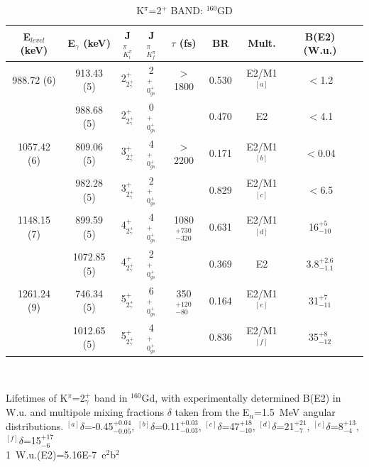 \begin{table}[h!]
\begin{center}
\caption{K$^\pi$=2$^+$ BAND: $^{160}$GD \label{tab:160Gd_gamma}}

\begin{tabular}{ccccccccc}
E$_{level}$ (keV) & E$_\gamma$ (keV) & J$^\pi_{K^\pi_i}$ & J$^\pi_{K^\pi_f}$ & $\tau$ (fs) & BR & Mult. &  B(E2) (W.u.) \\
\hline
\hline
988.72 (6)  & 913.43 (5) & 2$^+_{2^+_\gamma}$ & 2$^+_{0^+_{gs}}$ & $>$1800 & 0.530 & E2/M1$^{[a]}$ & $<$1.2\\%
            & 988.68 (5) & 2$^+_{2^+_\gamma}$ & 0$^+_{0^+_{gs}}$ &         & 0.470 & E2         & $<$4.1\\%

1057.42 (6) & 809.06 (5) & 3$^+_{2^+_\gamma}$ & 4$^+_{0^+_{gs}}$ & $>$2200 & 0.171 & E2/M1$^{[b]}$ & $<$0.04  \\ 
            & 982.28 (5) & 3$^+_{2^+_\gamma}$ & 2$^+_{0^+_{gs}}$ &         & 0.829 & E2/M1$^{[c]}$ & $<$6.5  \\ 

1148.15 (7) & 899.59 (5)  & 4$^+_{2^+_\gamma}$ & 4$^+_{0^+_{gs}}$ & 1080$^{+730}_{-320}$ & 0.631 & E2/M1$^{[d]}$ & 16$^{+5}_{-10}$  \\ 
            & 1072.85 (5) & 4$^+_{2^+_\gamma}$ & 2$^+_{0^+_{gs}}$ &                      & 0.369 & E2         & 3.8$^{+2.6}_{-1.1}$  \\ 

1261.24 (9) & 746.34 (5)  & 5$^+_{2^+_\gamma}$ & 6$^+_{0^+_{gs}}$ & 350$^{+120}_{-80}$ & 0.164 & E2/M1$^{[e]}$ & 31$^{+7}_{-11}$  \\ 
            & 1012.65 (5) & 5$^+_{2^+_\gamma}$ & 4$^+_{0^+_{gs}}$ &                    & 0.836 & E2/M1$^{[f]}$ & 35$^{+8}_{-12}$  \\ 
            \hline    
\end{tabular}\\ \vspace{10pt} \end{center}
Lifetimes of K$^\pi$=2$^+_\gamma$ band in $^{160}$Gd, with experimentally determined B(E2) in W.u. and multipole mixing fractions $\delta$ taken from the E$_n$=1.5~MeV angular distributions.
$^{[a]}\delta$=-0.45$^{+0.04}_{-0.05}$, $^{[b]}\delta$=0.11$^{+0.03}_{-0.03}$, $^{[c]}\delta$=47$^{+18}_{-10}$, $^{[d]}\delta$=21$^{+21}_{-7}$, $^{[e]}\delta$=8$^{+13}_{-4}$, $^{[f]}\delta$=15$^{+17}_{-6}$\\
1~W.u.(E2)=5.16E-7~e$^2$b$^2$\\
\end{table}

